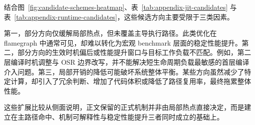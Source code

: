 结合图~\ref{fig:candidate-schemes-heatmap}、表~\ref{tab:appendix-jit-candidates} 与表~\ref{tab:appendix-runtime-candidates}，这些候选方向主要受限于三类因素。

第一，部分方向仅缓解局部热点，但未覆盖主导执行路径。此类优化在 flamegraph 中通常可见，却难以转化为宏观 benchmark 层面的稳定性能提升。第二，部分方向的生效时机偏后或性能提升窗口与目标工作负载不匹配。例如，第二层编译时机调整与 OSR 边界改写，并不能解决短生命周期负载最敏感的首层编译介入问题。第三，局部开销的降低可能破坏系统整体平衡。某些方向虽然减少了特定计算，却引入了冗余判断、增加了代码体积或降低了路径复用率，最终拖累整体性能。

这些扩展比较从侧面说明，正文保留的正式机制并非由局部热点直接决定，而是建立在主路径命中、机制可解释性与稳定性能提升三者同时成立的基础上。
